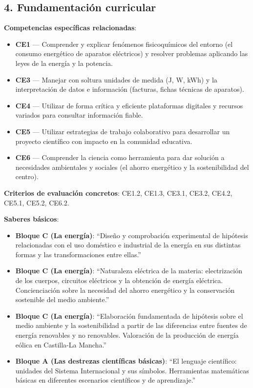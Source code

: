 \documentclass[11pt,a4paper]{article}
\begin{document}
\subsection*{4. Fundamentación curricular}
\textbf{Competencias específicas relacionadas}:
\begin{itemize}
    \item \textbf{CE1} --- Comprender y explicar fenómenos fisicoquímicos del entorno (el consumo energético de aparatos eléctricos) y resolver problemas aplicando las leyes de la energía y la potencia.
    \item \textbf{CE3} --- Manejar con soltura unidades de medida (J, W, kWh) y la interpretación de datos e información (facturas, fichas técnicas de aparatos).
    \item \textbf{CE4} --- Utilizar de forma crítica y eficiente plataformas digitales y recursos variados para consultar información fiable.
    \item \textbf{CE5} --- Utilizar estrategias de trabajo colaborativo para desarrollar un proyecto científico con impacto en la comunidad educativa.
    \item \textbf{CE6} --- Comprender la ciencia como herramienta para dar solución a necesidades ambientales y sociales (el ahorro energético y la sostenibilidad del centro).
\end{itemize}

\textbf{Criterios de evaluación concretos}: CE1.2, CE1.3, CE3.1, CE3.2, CE4.2, CE5.1, CE5.2, CE6.2.

\textbf{Saberes básicos}:
\begin{itemize}
    \item \textbf{Bloque C (La energía)}: ``Diseño y comprobación experimental de hipótesis relacionadas con el uso doméstico e industrial de la energía en sus distintas formas y las transformaciones entre ellas.''
    \item \textbf{Bloque C (La energía)}: ``Naturaleza eléctrica de la materia: electrización de los cuerpos, circuitos eléctricos y la obtención de energía eléctrica. Concienciación sobre la necesidad del ahorro energético y la conservación sostenible del medio ambiente.''
    \item \textbf{Bloque C (La energía)}: ``Elaboración fundamentada de hipótesis sobre el medio ambiente y la sostenibilidad a partir de las diferencias entre fuentes de energía renovables y no renovables. Valoración de la producción de energía eólica en Castilla-La Mancha.''
    \item \textbf{Bloque A (Las destrezas científicas básicas)}: ``El lenguaje científico: unidades del Sistema Internacional y sus símbolos. Herramientas matemáticas básicas en diferentes escenarios científicos y de aprendizaje.''
\end{itemize}
\end{document}
